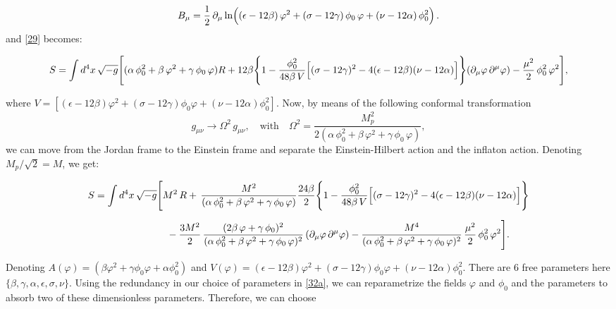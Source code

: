 \documentclass[aps,prd,reprint,preprintnumbers,showpacs,floatfix,nofootinbib,superscript address]{revtex4-2}
\begin{document}
\begin{equation}\label{30}
B_\mu = \frac{1}{2}\,\partial_\mu \ln\Bigl((\epsilon-12\beta)\,\varphi^2 + (\sigma-12\gamma)\,\phi_0\,\varphi + (\nu-12\alpha)\,\phi_0^2\Bigr)\,.
\end{equation}
and \ref{29} becomes:
\begin{widetext}
\begin{subequations}\label{33a}
\begin{align}
S = \int d^4x\, \sqrt{-g} \Biggl[ (\alpha\, \phi_0^2 + \beta\, \varphi^2 + \gamma\, \phi_0\,\varphi)R + 12\beta \Biggl\{1 - \frac{\phi_0^2}{48\beta\, V}\Bigl[(\sigma-12\gamma)^2 - 4(\epsilon-12\beta)(\nu-12\alpha)\Bigr]\Biggr\}
(\partial_{\mu}\varphi\, \partial^{\mu}\varphi) - \frac{\mu^2}{2}\,\phi_0^2\,\varphi^2 \Biggr],
\end{align}
\end{subequations}
\end{widetext}
where $V = [(\epsilon - 12\beta) \varphi^2 + (\sigma - 12\gamma) \phi_0 \varphi + (\nu - 12\alpha)\phi^2_0]$. Now, by means of the following conformal transformation 
\[
g_{\mu\nu}\rightarrow \Omega^2\,g_{\mu\nu},\quad\text{with}\quad \Omega^2 = \frac{M_p^2}{2(\alpha\,\phi_0^2+\beta\,\varphi^2+\gamma\,\phi_0\,\varphi)},
\]
we can move from the Jordan frame to the Einstein frame and separate the Einstein-Hilbert action and the inflaton action. Denoting $M_p/\sqrt{2} = M$, we get:
\begin{widetext}
\begin{subequations}\label{33a}
\begin{align}
S = \int d^4x\, \sqrt{-g} &\Biggl[ M^2\, R + \,\frac{M^2}{(\alpha\,\phi_0^2+\beta\,\varphi^2+\gamma\,\phi_0\,\varphi)}
\frac{24\beta}{2}\Biggl\{1 - \frac{\phi_0^2}{48\beta\,V}\Bigl[(\sigma-12\gamma)^2-4(\epsilon-12\beta)(\nu-12\alpha)\Bigr]\Biggr\} \nonumber\\[2mm]
&\quad - \frac{3M^2}{2}\,\frac{(2\beta\,\varphi+\gamma\,\phi_0)^2}{(\alpha\,\phi_0^2+\beta\,\varphi^2+\gamma\,\phi_0\,\varphi)^2}\,(\partial_{\mu}\varphi\,\partial^{\mu}\varphi) - \frac{M^4}{(\alpha\,\phi_0^2+\beta\,\varphi^2+\gamma\,\phi_0\,\varphi)^2}\,\frac{\mu^2}{2}\,\phi_0^2\,\varphi^2 \Biggr].
\end{align}
\end{subequations}
\end{widetext}
Denoting $A(\varphi) = (\beta\varphi^2+\gamma\phi_0\varphi+\alpha\phi_0^2)$ and $V(\varphi) = (\epsilon - 12\beta) \varphi^2 + (\sigma - 12\gamma) \phi_0  \varphi + (\nu - 12\alpha)\phi^2_0$. There are 6 free parameters here $\{ \beta, \gamma, \alpha , \epsilon, \sigma, \nu \}$. Using the redundancy in our choice of parameters in \ref{32a}, we can reparametrize the fields $\varphi$ and $\phi_0$ and the parameters to absorb two of these dimensionless parameters. Therefore, we can choose
\end{document}
